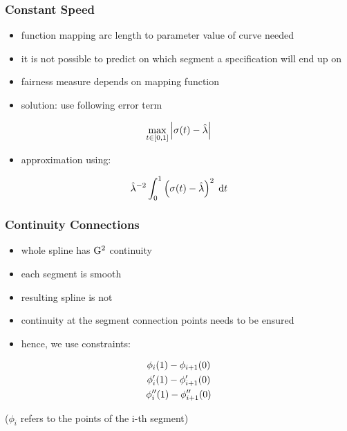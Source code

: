 \documentclass{beamer}
\begin{document}
		
		\begin{frame}
			\frametitle{Constant Speed}
			\begin{itemize}
				\item function mapping arc length to parameter value of curve needed
				\item it is not possible to predict on which segment a specification will end up on
				\item fairness measure depends on mapping function
				\item solution: use following error term
			\end{itemize}
			
			\begin{equation*}
				\max_{t \in \left[ 0,1 \right]} \left| \sigma\!\left( t \right) - \hat{\lambda} \right|
			\end{equation*}
			
			\begin{itemize}
				\item approximation using:
			\end{itemize}
			\begin{equation*}
				\hat{\lambda}^{-2}\int_{0}^{1} \left( \sigma\!\left( t \right) - \hat{\lambda} \right)^2 \; \mathrm{d}t
			\end{equation*}
		\end{frame}
		
		\begin{frame}
			\frametitle{Continuity Connections}
			\begin{itemize}
				\item whole spline has \(\mathrm{G}^{2}\) continuity
				\item each segment is smooth
				\item resulting spline is not
				\item continuity at the segment connection points needs to be ensured
				\item hence, we use constraints:
			\end{itemize}
			\begin{equation*}
				\begin{gathered}
					\phi_i\!\left( 1 \right) - \phi_{i + 1}\!\left( 0 \right)\\
					\phi'_i\!\left( 1 \right) - \phi'_{i + 1}\!\left( 0 \right)\\
					\phi''_i\!\left( 1 \right) - \phi''_{i + 1}\!\left( 0 \right)
				\end{gathered}
			\end{equation*}
			
			(\(\phi_i\) refers to the points of the i-th segment)
		\end{frame}
		
\end{document}
